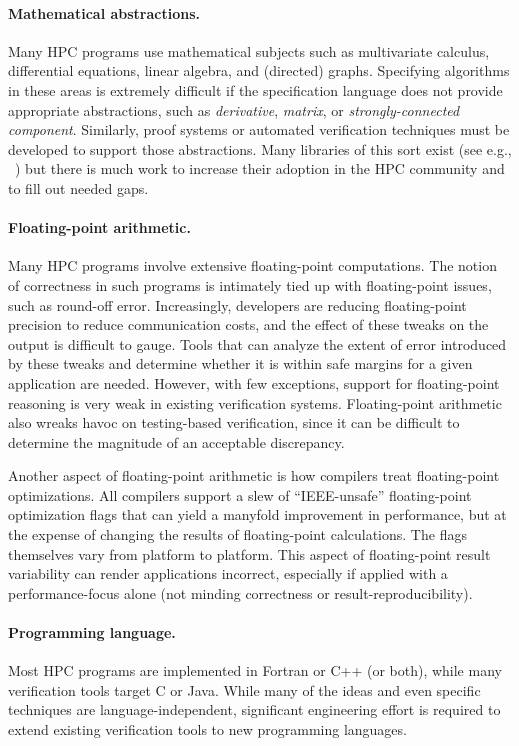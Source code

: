 \paragraph{Mathematical abstractions.}
Many HPC programs use mathematical subjects such as multivariate calculus, differential equations, linear algebra, and (directed) graphs.  Specifying algorithms in these areas is extremely difficult if the specification language does not provide appropriate abstractions, such as \emph{derivative}, \emph{matrix}, or \emph{strongly-connected component}.  Similarly, proof systems or automated verification techniques must be developed to support those abstractions.  Many libraries of this sort exist (see e.g., ~\cite{awesome-coq}) but there is much work to increase their adoption in the HPC community and to fill out needed gaps.

\paragraph{Floating-point arithmetic.}
Many HPC programs involve extensive float\-ing-point computations.  The notion of correctness in such programs is intimately tied up with floating-point issues, such as round-off error.  Increasingly, developers are reducing floating-point precision to reduce communication costs, and the effect of these tweaks on the output is difficult to gauge.  Tools that can analyze the extent of error introduced by these tweaks and determine whether it is within safe margins for a given application are needed.  However, with few exceptions, support for floating-point reasoning is very weak in existing verification systems. Floating-point arithmetic also wreaks havoc on testing-based verification, since it can be difficult to determine the magnitude of an acceptable discrepancy. 

Another aspect of floating-point arithmetic is how compilers treat float\-ing-point optimizations.
%
All compilers support a slew of ``IEEE-unsafe'' floating-point optimization flags that can yield a manyfold improvement in performance,  but at the expense of changing the results of floating-point calculations. 
%
The flags themselves vary from platform to platform.
%
This aspect of floating-point result variability can render applications incorrect, especially if applied with a performance-focus alone (not minding correctness or result-reproducibility).

\paragraph{Programming language.}
Most HPC programs are implemented in Fortran or C++ (or both), while many verification tools target C or Java.  While many of the ideas and even specific techniques are language-independent, significant engineering effort is required to extend existing verification tools to new programming languages.

